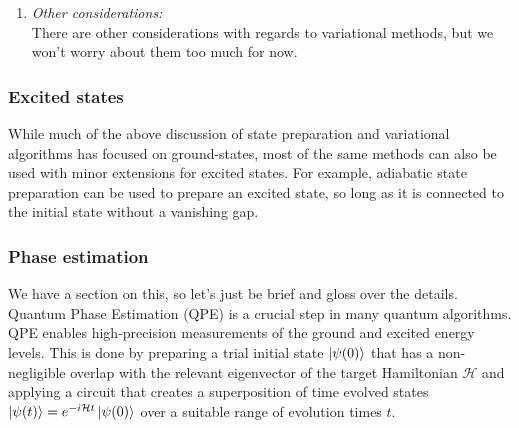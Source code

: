 \documentclass{book}
\theoremstyle{definition}
\newcommand{\had}{\mathcal{H}}
\begin{document}
\begin{enumerate}
	
	
	
	\item \textit{Other considerations:}\\
	
	 There are other considerations with regards to variational methods, but we won't worry about them too much for now.
\end{enumerate}






\subsubsection{Excited states}

While much of the above discussion of state preparation
and variational algorithms has focused on ground-states, most
of the same methods can also be used with minor extensions
for excited states. For example, adiabatic state preparation can
be used to prepare an excited state, so long as it is connected
to the initial state without a vanishing gap.


\subsubsection{Phase estimation}

We have a section on this, so let's just be brief and gloss over the details. \\


Quantum Phase Estimation (QPE) is a crucial step in many
quantum algorithms. QPE enables high-precision measurements of the ground and excited energy levels. This is done by preparing a trial initial state $\ket{\psi(0)}$ that has a non-negligible overlap with the relevant eigenvector of the target Hamiltonian $\had$ and applying a circuit that creates a superposition of time evolved states $\ket{\psi(t)} = e^{-i\had t}\ket{\psi(0)}$ over a suitable range of evolution times $t$. \\
\end{document}
